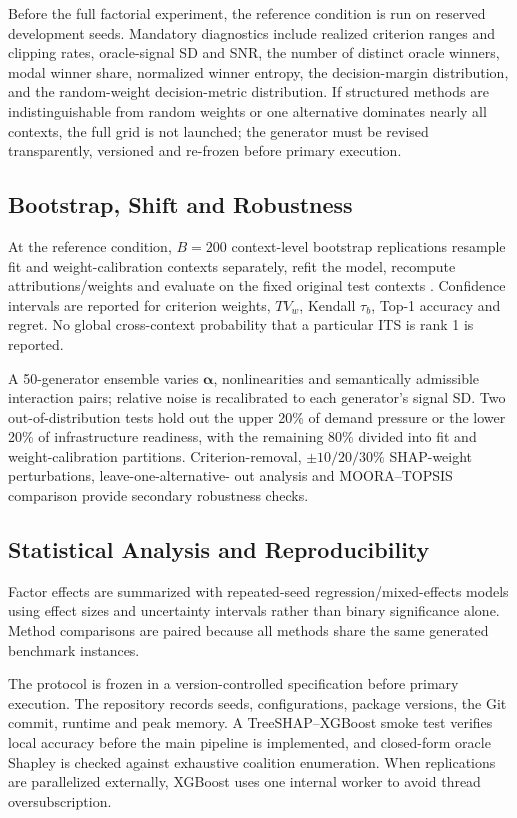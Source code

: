 \documentclass[runningheads]{llncs}
\begin{document}
Before the full factorial experiment, the reference condition is run on reserved development
seeds. Mandatory diagnostics include realized criterion ranges and clipping rates, oracle-signal
SD and SNR, the number of distinct oracle winners, modal winner share, normalized winner
entropy, the decision-margin distribution, and the random-weight decision-metric distribution.
If structured methods are indistinguishable from random weights or one alternative dominates
nearly all contexts, the full grid is not launched; the generator must be revised transparently,
versioned and re-frozen before primary execution.

\subsection{Bootstrap, Shift and Robustness}

At the reference condition, $B=200$ context-level bootstrap replications resample fit and
weight-calibration contexts separately, refit the model, recompute attributions/weights and
evaluate on the fixed original test contexts \cite{efron1993bootstrap}. Confidence intervals
are reported for criterion weights, $TV_w$, Kendall $\tau_b$, Top-1 accuracy and regret. No
global cross-context probability that a particular ITS is rank 1 is reported.

A 50-generator ensemble varies $\boldsymbol\alpha$, nonlinearities and semantically admissible
interaction pairs; relative noise is recalibrated to each generator's signal SD. Two
out-of-distribution tests hold out the upper 20\% of demand pressure or the lower 20\% of
infrastructure readiness, with the remaining 80\% divided into fit and weight-calibration
partitions. Criterion-removal, $\pm10/20/30\%$ SHAP-weight perturbations, leave-one-alternative-
out analysis and MOORA--TOPSIS comparison provide secondary robustness checks.

\subsection{Statistical Analysis and Reproducibility}

Factor effects are summarized with repeated-seed regression/mixed-effects models using effect
sizes and uncertainty intervals rather than binary significance alone. Method comparisons are
paired because all methods share the same generated benchmark instances.

The protocol is frozen in a version-controlled specification before primary execution.
The repository records seeds, configurations, package versions, the Git commit, runtime and peak
memory. A TreeSHAP--XGBoost smoke test verifies local accuracy before the main pipeline is
implemented, and closed-form oracle Shapley is checked against exhaustive coalition enumeration.
When replications are parallelized externally, XGBoost uses one internal worker to avoid thread
oversubscription.
\end{document}
